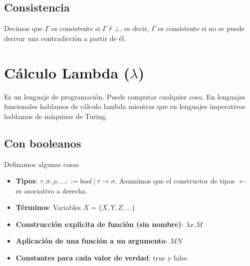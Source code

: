 \documentclass[10pt,a4paper]{article}
\begin{document}
\subsection*{Consistencia}
Decimos que $\Gamma$ es consistente si $\Gamma \nvdash \bot$, es decir, $\Gamma$ es consistente si no se puede derivar una contradicción a partir de él.
\section*{Cálculo Lambda ($\lambda$)}
Es un lenguaje de programación. Puede computar cualquier cosa. En lenguajes funcionales hablamos de cálculo lambda mientras que en lenguajes imperativos hablamos de máquinas de Turing. 
\subsection*{Con booleanos}
Definamos algunas cosas 
\begin{itemize}
    \item \textbf{Tipos}: $\tau, \sigma, \rho, \dots ::= bool \ | \ \tau \rightarrow \sigma$. 
    Asumimos que el constructor de tipos $\leftarrow$ es asociativo a derecha.
    \item \textbf{Términos}: Variables $X = \{X, Y, Z, \dots\}$
    \item \textbf{Construcción explícita de función (sin nombre)}: $\lambda x . M$ 
    \item \textbf{Aplicación de una función a un argumento}: $MN$ 
    \item \textbf{Constantes para cada valor de verdad}: true y false.
\end{itemize}
\end{document}
